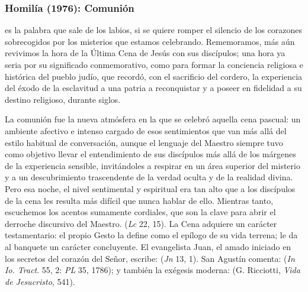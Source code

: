 \newpage

\subsubsection{Homilía (1976): Comunión}


\begin{body}
 es la palabra que sale de los labios, si se quiere romper el silencio de los corazones sobrecogidos por los misterios que estamos celebrando. Rememoramos, más aún revivimos la hora de la Última Cena de Jesús con sus discípulos; una hora ya seria por su significado conmemorativo, como para formar la conciencia religiosa e histórica del pueblo judío, que recordó, con el sacrificio del cordero, la experiencia del éxodo de la esclavitud a una patria a reconquistar y a poseer en fidelidad a su destino religioso, durante siglos. 

La comunión fue la nueva atmósfera en la que se celebró aquella cena pascual: un ambiente afectivo e intenso cargado de esos sentimientos que van más allá del estilo habitual de conversación, aunque el lenguaje del Maestro siempre tuvo como objetivo llevar el entendimiento de sus discípulos más allá de los márgenes de la experiencia sensible, invitándoles a respirar en un área superior del misterio y a un descubrimiento trascendente de la verdad oculta y de la realidad divina. Pero esa noche, el nivel sentimental y espiritual era tan alto que a los discípulos de la cena les resulta más difícil que nunca hablar de ello. Mientras tanto, escuchemos los acentos sumamente cordiales, que son la clave para abrir el derroche discursivo del Maestro.  (\textit{Lc} 22, 15). La Cena adquiere un carácter testamentario: el propio Gesto la define como el epílogo de su vida terrena; le da al banquete un carácter concluyente. El evangelista Juan, el amado iniciado en los secretos del corazón del Señor, escribe:  (\textit{Jn} 13, 1). San Agustín comenta:  (\textit{In Io. Tract}. 55, 2: \textit{PL} 35, 1786); y también la exégesis moderna:  (G. Ricciotti, \textit{Vida de Jesucristo}, 541).


\end{body}
